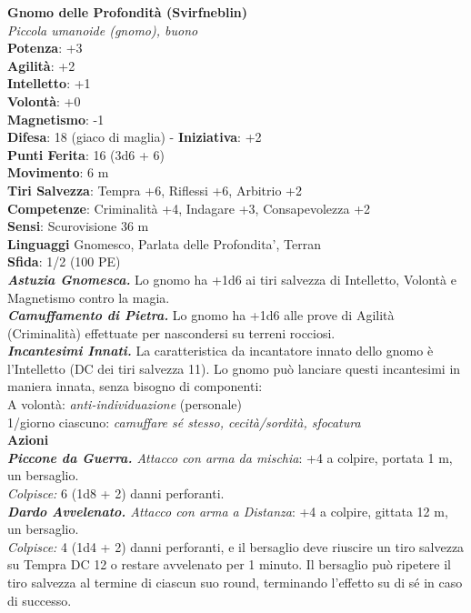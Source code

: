 \begin{multicols}{2}
\medskip\textbf{Gnomo delle Profondità (Svirfneblin)} \\
\emph{Piccola umanoide (gnomo), buono}\\
\textbf{Potenza}: +3\\
\textbf{Agilità}: +2\\
\textbf{Intelletto}: +1\\
\textbf{Volontà}: +0\\
\textbf{Magnetismo}: -1\\
\textbf{Difesa}: 18 (giaco di maglia) - \textbf{Iniziativa}: +2\\
\textbf{Punti Ferita}: 16 (3d6 + 6)\\
\textbf{Movimento}: 6 m\\
\textbf{Tiri Salvezza}: Tempra +6, Riflessi +6, Arbitrio +2\\
\textbf{Competenze}: Criminalità +4, Indagare +3, Consapevolezza +2\\
\textbf{Sensi}: Scurovisione 36 m\\
\textbf{Linguaggi} Gnomesco, Parlata delle Profondita', Terran\\
\textbf{Sfida}: 1/2 (100 PE)\smallskip\\
\emph{\textbf{Astuzia Gnomesca.}} Lo gnomo ha +1d6 ai tiri salvezza di Intelletto, Volontà e Magnetismo contro la magia.\\
\emph{\textbf{Camuffamento di Pietra.}} Lo gnomo ha +1d6 alle prove di Agilità (Criminalità) effettuate per nascondersi su terreni rocciosi.\\
\emph{\textbf{Incantesimi Innati.}} La caratteristica da incantatore innato dello gnomo è l'Intelletto (DC dei tiri salvezza 11). Lo gnomo può lanciare questi incantesimi in maniera innata, senza bisogno di componenti:\\
A volontà: \emph{anti-individuazione} (personale)\\
1/giorno ciascuno: \emph{camuffare sé stesso, cecità/sordità, sfocatura}\\
\smallskip\textbf{Azioni}\\
\emph{\textbf{Piccone da Guerra.} Attacco con arma da mischia}: +4 a colpire, portata 1 m, un bersaglio.\\
\emph{Colpisce:} 6 (1d8 + 2) danni perforanti.\\
\emph{\textbf{Dardo Avvelenato.} Attacco con arma a Distanza}: +4 a colpire, gittata 12 m, un bersaglio.\\
\emph{Colpisce:} 4 (1d4 + 2) danni perforanti, e il bersaglio deve riuscire un tiro salvezza su Tempra DC 12 o restare avvelenato per 1 minuto. Il bersaglio può ripetere il tiro salvezza al termine di ciascun suo round, terminando l'effetto su di sé in caso di successo.\\

\end{multicols}
